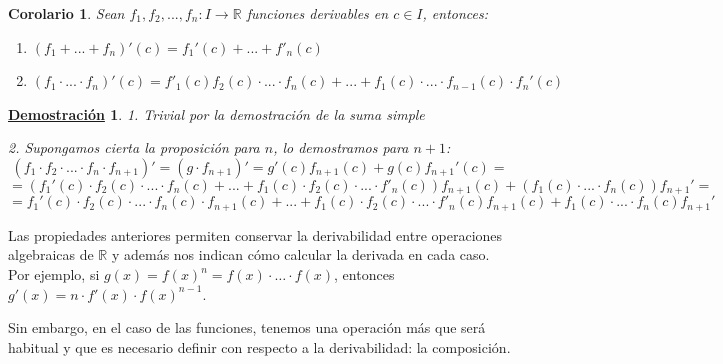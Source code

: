 \documentclass[10pt,a4paper,openright]{book}
\theoremstyle{break}
\newtheorem{coro}{Corolario}[theo]
\newtheorem*{demo}{\underline{Demostración}}
\begin{document}
\begin{coro}
Sean $f_1, f_2, ..., f_n: I \rightarrow \mathbb R$ funciones derivables en $c\in I$, entonces:
\begin{enumerate}
\item $(f_1+...+f_n)'(c)=f_1'(c)+...+f'_n(c)$
\item $(f_1\cdot ... \cdot f_n)'(c)= f'_1(c)f_2(c)\cdot ... \cdot f_n(c)+ ... + f_1(c)\cdot ... \cdot f_{n-1}(c) \cdot f_n'(c)$
\end{enumerate}
\end{coro}
\begin{demo}
1. Trivial por la demostración de la suma simple

2. Supongamos cierta la proposición para $n$, lo demostramos para $n+1$:
$$(f_1 \cdot f_2 \cdot ... \cdot f_n \cdot f_{n+1})'=(g\cdot f_{n+1})'= g'(c)f_{n+1}(c)+ g(c)f_{n+1}'(c) =$$
$$= \left(f_1'(c)\cdot f_2(c) \cdot ... \cdot f_n(c) +...+ f_1(c)\cdot f_2(c)\cdot ...\cdot f'_n(c)\right)f_{n+1}(c)+(f_1(c)\cdot ...\cdot f_n(c))f_{n+1}'= $$
$$=f_1'(c)\cdot f_2(c) \cdot ... \cdot f_n(c)\cdot f_{n+1}(c) +...+ f_1(c)\cdot f_2(c)\cdot ...\cdot f'_n(c)f_{n+1}(c)+f_1(c)\cdot ...\cdot f_n(c)f_{n+1}'$$
\end{demo}

Las propiedades anteriores permiten conservar la derivabilidad entre operaciones algebraicas de $\mathbb R$ y además nos indican cómo calcular la derivada en cada caso. Por ejemplo, si $g(x)= f(x)^n = f(x) \cdot \ldots \cdot f(x)$, entonces $g'(x)= n\cdot f'(x) \cdot f(x)^{n-1}$.

Sin embargo, en el caso de las funciones, tenemos una operación más que será habitual y que es necesario definir con respecto a la derivabilidad: la composición.
\end{document}
